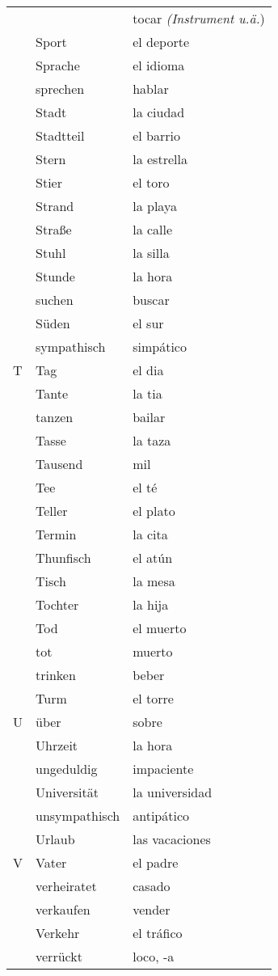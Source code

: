 \documentclass{spanish_summary}
\begin{document}
\begin{longtable}{p{} p{} | p{}}
& & tocar \textit{(Instrument u.ä.}) \\
& Sport & el deporte  \\
& Sprache & el idioma  \\
& sprechen & hablar  \\
& Stadt & la ciudad \\
& Stadtteil & el barrio  \\
& Stern & la estrella \\
& Stier & el toro  \\
& Strand & la playa  \\
& Straße & la calle  \\
& Stuhl & la silla  \\
& Stunde & la hora  \\
& suchen & buscar  \\
& Süden & el sur  \\
& sympathisch & simpático \\
T & Tag & el dia  \\
& Tante & la tia  \\
& tanzen & bailar  \\
& Tasse & la taza  \\
& Tausend & mil  \\
& Tee & el té\\
& Teller & el plato  \\
& Termin & la cita  \\
& Thunfisch & el atún \\
& Tisch & la mesa  \\
& Tochter & la hija  \\
& Tod & el muerto \\
& tot & muerto \\
& trinken & beber  \\
& Turm & el torre  \\
U & über & sobre\\
& Uhrzeit & la hora  \\
& ungeduldig & impaciente \\
& Universität & la universidad \\
& unsympathisch & antipático\\
& Urlaub & las vacaciones  \\
V & Vater & el padre  \\
& verheiratet & casado  \\
& verkaufen & vender  \\
& Verkehr & el tráfico \\
& verrückt & loco, -a  \\

\end{longtable}
\end{document}
